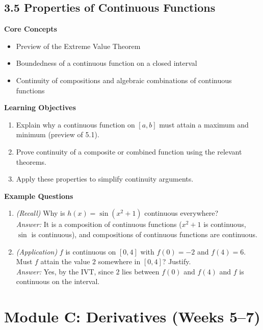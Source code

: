 \documentclass[11pt]{article}
\begin{document}
\subsection{3.5 Properties of Continuous Functions}
\textbf{Core Concepts}
\begin{itemize}
\item Preview of the Extreme Value Theorem
\item Boundedness of a continuous function on a closed interval
\item Continuity of compositions and algebraic combinations of continuous functions
\end{itemize}
\textbf{Learning Objectives}
\begin{enumerate}
\item Explain why a continuous function on $[a,b]$ must attain a maximum and minimum (preview of 5.1).
\item Prove continuity of a composite or combined function using the relevant theorems.
\item Apply these properties to simplify continuity arguments.
\end{enumerate}
\textbf{Example Questions}
\begin{enumerate}
\item \emph{(Recall)} Why is $h(x) = \sin(x^2+1)$ continuous everywhere? \\
\textit{Answer:} It is a composition of continuous functions ($x^2+1$ is continuous, $\sin$ is continuous), and compositions of continuous functions are continuous.
\item \emph{(Application)} $f$ is continuous on $[0,4]$ with $f(0)=-2$ and $f(4)=6$. Must $f$ attain the value $2$ somewhere in $[0,4]$? Justify. \\
\textit{Answer:} Yes, by the IVT, since $2$ lies between $f(0)$ and $f(4)$ and $f$ is continuous on the interval.
\end{enumerate}

\section{Module C: Derivatives (Weeks 5--7)}
\end{document}
